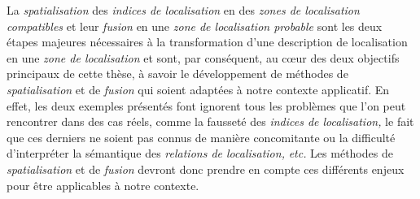 La \emph{spatialisation} des \emph{indices de localisation} en des
\emph{zones de localisation compatibles} et leur \emph{fusion} en une
\emph{zone de localisation probable} sont les deux étapes majeures
nécessaires à la transformation d'une description de localisation en
une \emph{zone de localisation} et sont, par conséquent, au cœur des
deux objectifs principaux de cette thèse, à savoir le développement de
méthodes de \emph{spatialisation} et de \emph{fusion} qui soient
adaptées à notre contexte applicatif. En effet, les deux exemples
présentés font ignorent tous les problèmes que l'on peut rencontrer
dans des cas réels, comme la fausseté des \emph{indices de
  localisation,} le fait que ces derniers ne soient pas connus de
manière concomitante ou la difficulté d'interpréter la sémantique des
\emph{relations de localisation,} \emph{etc.} Les méthodes de
\emph{spatialisation} et de \emph{fusion} devront donc prendre en
compte ces différents enjeux pour être applicables à notre contexte.


